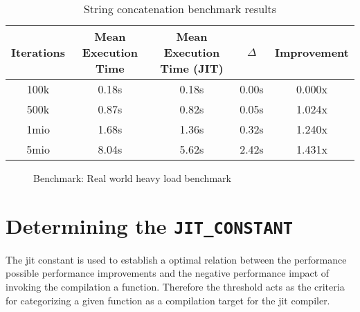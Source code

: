 \begin{table}[H]
    \centering
    \begin{tabular}{c|c|c|c|c}
        Iterations & Mean Execution Time & Mean Execution Time (JIT) & $\Delta$ & Improvement \\ 
        \hline
        100k & 0.18s & 0.18s & 0.00s & 0.000x \\
        500k & 0.87s & 0.82s & 0.05s & 1.024x \\
        1mio & 1.68s & 1.36s & 0.32s & 1.240x \\
        5mio & 8.04s & 5.62s & 2.42s & 1.431x\\
    \end{tabular}
    \label{table:benchmark-realworld}
    \caption{String concatenation benchmark results}
\end{table}

\begin{figure}[H]
    \centering
    \caption{Benchmark: Real world heavy load benchmark}
    \label{chart:benchmark-realworld}
\end{figure}

\section{Determining the \texttt{JIT\_CONSTANT}}
\label{sec:jit-constant-discussion}

The jit constant is used to establish a optimal relation between the
performance possible performance improvements and the negative performance
impact of invoking the compilation a function. Therefore the threshold acts as
the criteria for categorizing a given function as a compilation target for the
jit compiler. 
